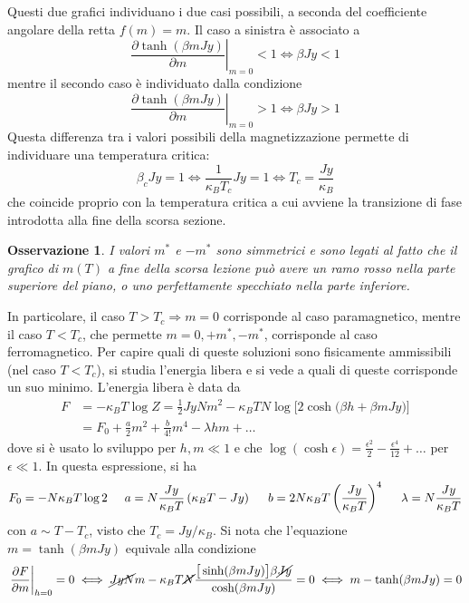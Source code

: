 \documentclass[11pt, a4paper]{scrartcl}
\theoremstyle{style}
\newtheorem{osservazione}{Osservazione}[section]
\theoremstyle{style1}
\newcommand*\Eval[3]{\left.#1\right\rvert_{#2}^{#3}}
\numberwithin{equation}{subsection}
\begin{document}
Questi due grafici individuano i due casi possibili, a seconda del coefficiente angolare della retta $f(m) = m$.
Il caso a sinistra \`e associato a 
\[
	\Eval{\frac{\partial \tanh(\beta mJy)}{\partial m} }{m=0}{} <1 \iff \beta J y <1
\] 
mentre il secondo caso \`e individuato dalla condizione 
\[
	\Eval{\frac{\partial \tanh(\beta mJy)}{\partial m} }{m=0}{} >1 \iff \beta J y >1
\] 
Questa differenza tra i valori possibili della magnetizzazione permette di individuare una temperatura critica:
\[
\beta _c Jy = 1 \iff \frac{1}{\kappa _B T_c}Jy = 1 \iff T_c  = \frac{Jy}{\kappa _B}
\] 
che coincide proprio con la temperatura critica a cui avviene la transizione di fase introdotta alla fine della scorsa sezione.
\begin{osservazione}
	I valori $m^*$ e $-m^*$ sono simmetrici e sono legati al fatto che il grafico di $m(T)$ a fine della scorsa lezione pu\`o avere un ramo rosso nella parte superiore del piano, o uno perfettamente specchiato nella parte inferiore.
\end{osservazione}
\noindent In particolare, il caso $T>T_c \Rightarrow m=0$ corrisponde al caso paramagnetico, mentre il caso $T<T_c$, che permette $m=0, +m^*, - m^*$, corrisponde al caso ferromagnetico.
Per capire quali di queste soluzioni sono fisicamente ammissibili (nel caso $T<T_c$), si studia l'energia libera e si vede a quali di queste corrisponde un suo minimo.
L'energia libera \`e data da
\[
	\begin{split}
		F &= -\kappa _B T \log Z = \frac{1}{2} Jy N m^2 - \kappa _B T N \log \Big[2\cosh\big(\beta h+\beta mJy\big)\Big]\\
		  &= F_0 + \frac{a}{2}m^2 + \frac{b}{4!}m^4 - \lambda hm + \ldots
	\end{split}
\] 
dove si \`e usato lo sviluppo per $h,m \ll 1$ e che $\log(\cosh \epsilon ) = \frac{\epsilon ^2}{2}- \frac{\epsilon ^4}{12}+\ldots$ per $\epsilon \ll 1$.
In questa espressione, si ha
\[
F_0=-N\kappa _B T \log 2 \hspace{.5cm} a = N \frac{Jy}{\kappa _B T } \left(\kappa _B T - Jy\right)  \hspace{.5cm} b = 2N \kappa _B T \left(\frac{Jy}{\kappa _B T}\right) ^4 \hspace{.5cm}\lambda = N \frac{Jy}{\kappa _B T}
\] 
con $a \sim T-T_c$, visto che $T_c = Jy / \kappa _B$.
Si nota che l'equazione $m=\tanh(\beta mJy)$ equivale alla condizione 
\[
	\Eval{\frac{\partial F}{\partial m} }{h=0}{} = 0 \iff \cancel{JyN}m - \kappa _B T \cancel{N} \frac{\big[ \sinh(\beta mJy) \big] \beta \cancel{Jy}}{\cosh(\beta mJy)}=0 \iff m - \tanh(\beta mJy) = 0
\] 
\end{document}
